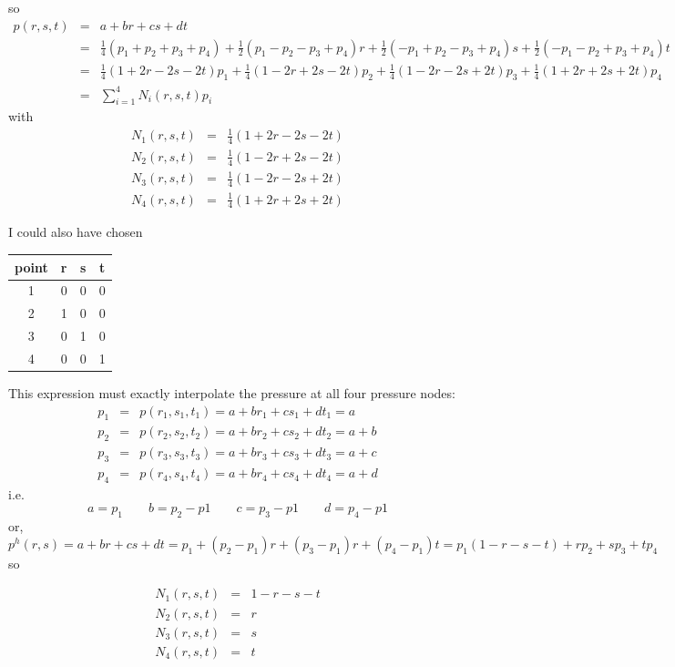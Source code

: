 so 
\begin{eqnarray}
p(r,s,t)
&=& a+br+cs+dt \nonumber\\
&=& \frac{1}{4}(p_1+p_2+p_3+p_4)
+\frac{1}{2}(p_1-p_2-p_3+p_4)r
+\frac{1}{2}(-p_1+p_2-p_3+p_4)s
+\frac{1}{2}(-p_1-p_2+p_3+p_4)t\nonumber\\
&=&
\frac{1}{4}(1+2r-2s-2t)p_1+
\frac{1}{4}(1-2r+2s-2t)p_2+
\frac{1}{4}(1-2r-2s+2t)p_3+
\frac{1}{4}(1+2r+2s+2t)p_4 \nonumber\\
&=& \sum_{i=1}^4 N_i(r,s,t) p_i
\end{eqnarray}
with
\begin{eqnarray}
N_1(r,s,t) &=& \frac{1}{4}(1+2r-2s-2t)\nonumber\\
N_2(r,s,t) &=& \frac{1}{4}(1-2r+2s-2t)\nonumber\\
N_3(r,s,t) &=& \frac{1}{4}(1-2r-2s+2t)\nonumber\\
N_4(r,s,t) &=& \frac{1}{4}(1+2r+2s+2t)\nonumber
\end{eqnarray}

\vspace{.6cm}

I could also have chosen 

\begin{tabular}{cccc}
\hline
point & r & s & t \\
\hline
1& 0 & 0 &0 \\
2& 1 & 0 &0 \\
3& 0 & 1 &0 \\
4& 0 & 0 &1 \\
\hline
\end{tabular}

This expression must exactly interpolate the pressure at all four pressure nodes:
\begin{eqnarray}
p_1  &=& p(r_1,s_1,t_1) = a+br_1+cs_1+dt_1 = a\nonumber\\
p_2  &=& p(r_2,s_2,t_2) = a+br_2+cs_2+dt_2 = a+b\nonumber\\
p_3  &=& p(r_3,s_3,t_3) = a+br_3+cs_3+dt_3 = a+c\nonumber\\
p_4  &=& p(r_4,s_4,t_4) = a+br_4+cs_4+dt_4 = a+d\nonumber
\end{eqnarray}
i.e.
\[
a=p_1
\qquad
b=p_2-p1
\qquad
c=p_3-p1
\qquad
d=p_4-p1
\]
or, 
\[
p^h(r,s)=a+br+cs+dt=p_1 + (p_2-p_1)r + (p_3-p_1)r + (p_4-p_1)t  = p_1(1-r-s-t) + r p_2 + s p_3 + t p_4
\]
so 
\begin{mdframed}[backgroundcolor=blue!5]
\begin{eqnarray}
N_1(r,s,t) &=& 1-r-s-t \\ 
N_2(r,s,t) &=& r \\
N_3(r,s,t) &=& s \\
N_4(r,s,t) &=& t
\end{eqnarray}
\end{mdframed}






